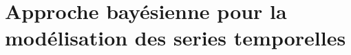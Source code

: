\documentclass{presentation_template}
\begin{document}
\section{Approche bayésienne pour la modélisation des series temporelles}

\end{document}
